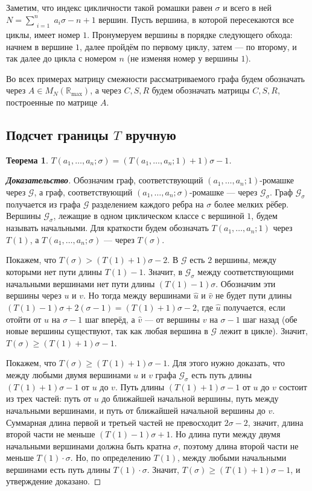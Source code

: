 \documentclass[12pt]{article}
\newtheorem{theorem}{Теорема}[section]
\begin{document}
Заметим, что индекс цикличности такой ромашки равен $\sigma$ и всего в ней $N = \sum\limits_{\substack{i=1}}^n a_i\sigma - n + 1$ вершин. Пусть вершина, в которой пересекаются все циклы, имеет номер $1$. Пронумеруем вершины в порядке следующего обхода: начнем в вершине $1$, далее пройдём по первому циклу, затем --- по второму, и так далее до цикла с номером $n$ (не изменяя номер у вершины $1$).

Во всех примерах матрицу смежности рассматриваемого графа будем обозначать через $A \in M_N(\mathbb{R}_{\max})$, а через $C, S, R$ будем обозначать матрицы $C, S, R$, построенные по матрице $A$.

\subsection{Подсчет границы $T$ вручную}
\begin{theorem}
\label{everyKFormula}
$T(a_1, \dots, a_n; \sigma) = (T(a_1, \dots, a_n; 1) + 1)\sigma - 1$.
\end{theorem}
\begin{proof}[\textbf{Доказательство}] 
Обозначим граф, соответствующий $(a_1, \dots, a_n; 1)$-ромашке через $\mathcal{G}$, а граф, соответствующий $(a_1, \dots, a_n; \sigma)$-ромашке --- через $\mathcal{G}_\sigma$. Граф $\mathcal{G}_\sigma$ получается из графа $\mathcal{G}$ разделением каждого ребра на $\sigma$ более мелких рёбер. Вершины $\mathcal{G}_\sigma$, лежащие в одном циклическом классе с вершиной $1$, будем называть начальными. Для краткости будем обозначать $T(a_1, \dots, a_n; 1)$ через $T(1)$, а $T(a_1, \dots, a_n; \sigma)$ --- через $T(\sigma)$.

Покажем, что $T(\sigma) > (T(1) + 1)\sigma - 2$. В $\mathcal{G}$ есть $2$ вершины, между которыми нет пути длины $T(1) - 1$. Значит, в $\mathcal{G}_\sigma$ между соответствующими начальными вершинами нет пути длины $(T(1) - 1)\sigma$. Обозначим эти вершины через $u$ и $v$. Но тогда между вершинами $\hat{u}$ и $\hat{v}$ не будет пути длины $(T(1) - 1)\sigma + 2(\sigma - 1) = (T(1) + 1)\sigma - 2$, где $\hat{u}$ получается, если отойти от $u$ на $\sigma - 1$  шаг вперёд, а $\hat{v}$ --- от вершины $v$ на $\sigma - 1$ шаг назад (обе новые вершины существуют, так как любая вершина в $\mathcal{G}$ лежит в цикле). Значит, $T(\sigma) \ge (T(1) + 1)\sigma - 1$.

Покажем, что $T(\sigma) \ge (T(1) + 1)\sigma - 1$. Для этого нужно доказать, что между любыми двумя вершинами $u$ и $v$ графа $\mathcal{G}_\sigma$ есть путь длины $(T(1) + 1)\sigma - 1$ от $u$ до $v$. Путь длины $(T(1) + 1)\sigma - 1$ от $u$ до $v$ состоит из трех частей: путь от $u$ до ближайшей начальной вершины, путь между начальными вершинами, и путь от ближайшей начальной вершины до $v$. Суммарная длина первой и третьей частей не превосходит $2\sigma - 2$, значит, длина второй части не меньше $(T(1) - 1)\sigma + 1$. Но длина пути между двумя начальными вершинами должна быть кратна $\sigma$, поэтому длина второй части не меньше $T(1)\cdot \sigma$. Но, по определению $T(1)$, между любыми начальными вершинами есть путь длины $T(1)\cdot \sigma$. Значит, $T(\sigma) \ge (T(1) + 1)\sigma - 1$, и утверждение доказано.
\end{proof}
\end{document}
